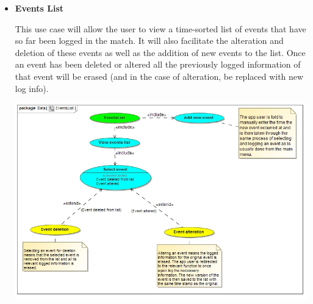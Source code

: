 \documentclass[a4paper,12pt]{report}
\begin{document}
\begin{itemize}
	\item \textbf{Events List}
		\begin{flushleft}
			This use case will allow the user to view a time-sorted list of events that have so far been logged in the match. It will also facilitate the alteration and deletion of these events as well as the addition of new events to the list. Once an event has been deleted or altered all the previously logged information of that event will be erased (and in the case of alteration, be replaced with new log info).
		\end{flushleft}
		\begin{center}
		\includegraphics[width=1\textwidth]{./Diagrams/EventsList.jpg}\\[0.4cm]
		\end{center}
\end{itemize}
\newpage
\end{document}
